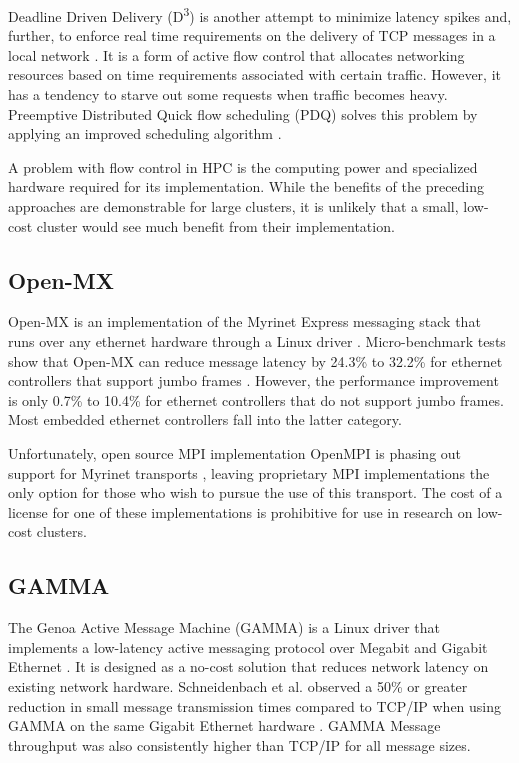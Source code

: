 \documentclass[11pt]{book}
\begin{document}
Deadline Driven Delivery (D\textsuperscript{3}) is another attempt to minimize latency spikes
and, further, to enforce real time requirements on the delivery of TCP messages
in a local network \cite{liu-13}. It is a form of active flow control that allocates
networking resources based on time requirements associated with certain
traffic. However, it has a tendency to starve out some requests when traffic
becomes heavy. Preemptive Distributed Quick flow scheduling (PDQ) solves this
problem by applying an improved scheduling algorithm \cite{liu-13}.

A problem with flow control in HPC is the computing power and specialized
hardware required for its implementation. While the benefits of the preceding
approaches are demonstrable for large clusters, it is unlikely that a small,
low-cost cluster would see much benefit from their implementation.

\subsection{\textbf{Open-MX}}

Open-MX is an implementation of the Myrinet Express messaging stack that runs
over any ethernet hardware through a Linux driver
\cite{goglin-08}. Micro-benchmark tests show that Open-MX can reduce message
latency by 24.3\% to 32.2\% for ethernet controllers that support jumbo frames
\cite{goglin-11}. However, the performance improvement is only 0.7\% to 10.4\%
for ethernet controllers that do not support jumbo frames. Most embedded
ethernet controllers fall into the latter category.

Unfortunately, open source MPI implementation OpenMPI is phasing out support for
Myrinet transports \cite{openmpi-myrinet}, leaving proprietary MPI implementations
the only option for those who wish to pursue the use of this transport. The cost
of a license for one of these implementations is prohibitive for use in research
on low-cost clusters.

\subsection{\textbf{GAMMA}}

The Genoa Active Message Machine (GAMMA) is a Linux driver that implements a
low-latency active messaging protocol over Megabit and Gigabit Ethernet
\cite{gamma}. It is designed as a no-cost solution that reduces network latency
on existing network hardware. Schneidenbach et al. observed a 50\% or greater
reduction in small message transmission times compared to TCP/IP when using
GAMMA on the same Gigabit Ethernet hardware \cite{schneidenbach-03}. GAMMA
Message throughput was also consistently higher than TCP/IP for all message
sizes.
\end{document}
